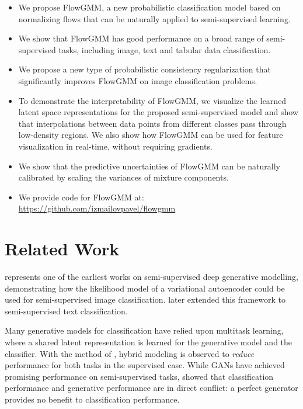 \documentclass{article}
\newcommand{\method}{FlowGMM\xspace}
\begin{document}
\begin{itemize}

\item We propose \method, a new probabilistic classification model based on 
normalizing flows that can be naturally applied to semi-supervised learning.
\item We show that \method has good performance on a broad range of semi-supervised tasks, including image, text and tabular data classification.
\item We propose a new type of probabilistic consistency regularization that significantly improves \method on image classification problems.  
\item To demonstrate the interpretability of \method, we visualize the learned latent space representations for the proposed semi-supervised model and show that interpolations between data points from different classes pass through low-density regions. We also show how \method can be used for feature visualization in real-time, without requiring gradients.
\item We show that the predictive uncertainties of \method can be naturally calibrated by scaling the variances of mixture components. 
\item We provide code for \method at: \url{https://github.com/izmailovpavel/flowgmm}

\end{itemize}


\section{Related Work}

 \citet{kingma2014semi} represents one of the earliest works on semi-supervised deep generative modelling, demonstrating how the likelihood model of a variational autoencoder \citep{kingma2013auto} could be used for semi-supervised image classification. \citet{xu2017variational} later extended this framework to semi-supervised text classification. 
 
Many generative models for classification \citep{salimans2016improved,nalisnick2019hybrid,chen2019residual} have relied upon multitask learning, where a shared latent representation is learned for the generative model and the classifier.
With the method of \citet{chen2019residual}, hybrid modeling is observed to \textit{reduce} performance for both tasks in the supervised case.
While GANs have achieved promising performance on semi-supervised tasks, \citet{dai2017} showed that classification performance and generative performance are in direct conflict: a perfect generator provides no benefit to classification performance. 
\end{document}
